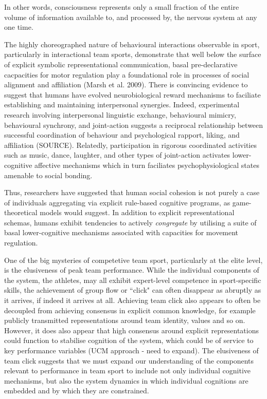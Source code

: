 \documentclass[12pt]{report}
\begin{document}
In other words, consciousness represents only a small fraction of the entire volume of information available to, and processed by, the nervous system at any one time.




The highly choreographed nature of behavioural interactions observable in sport, particularly in interactional team sports, demonstrate that well below the surface of explicit symbolic representational communication, basal pre-declarative cacpacities for motor regulation play a foundational role in processes of social alignment and affiliation (Marsh et al. 2009). There is convincing evidence to suggest that humans have evolved neurobiological reward mechanisms to faciliate establishing and maintaining interpersonal synergies.  Indeed, experimental research involving interpersonal linguistic exchange, behavioural mimicry, behavioural synchrony, and joint-action suggests a reciprocal relationship between successful coordination of behaviour and psychological rapport, liking, and affiliation (SOURCE).  Relatedly, participation in rigorous coordinated activities such as music, dance, laughter, and other types of joint-action activates lower-cognitive affective mechanisms which in turn faciliates psychophysiological states amenable to social bonding.

Thus, researchers have suggested that human social cohesion is not purely a case of individuals aggregating via explicit rule-based cognitive programs, as game-theoretical models would suggest. In addition to explicit representational schemas, humans exhibit tendencies to actively \textit{congregate} by utilising a suite of basal lower-cognitive mechanisms associated with capacities for movement regulation.








One of the big mysteries of competetive team sport, particularly at the elite level, is the elusiveness of peak team performance.  While the individual components of the system, the athletes, may all exhibit expert-level competence in sport-specific skills, the achievement of group flow or ``click" can often disappear as abruptly as it arrives, if indeed it arrives at all.  Achieving team click also appears to often be decoupled from achieving consensus in explicit common knowledge, for example publicly transmitted representations around team identity, values and so on.  However, it does also appear that high consensus around explicit representations could function to stabilise cognition of the system, which could be of service to key performance variables (UCM approach - need to expand).  The elusiveness of team click  suggests that we must expand our understanding of the components relevant to performance in team sport to include not only individual cognitive mechanisms, but also the system dynamics in which individual cognitions are embedded and by which they are constrained.
\end{document}
